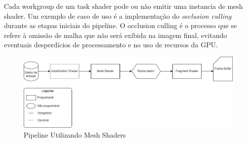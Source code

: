 Cada workgroup de um task shader pode ou não emitir uma instancia de mesh shader. Um exemplo de caso de uso é a implementação do \textit{occlusion culling} durante as etapas iniciais do pipeline. O occlusion culling é o processo que se refere à omissão de malha que não será exibida na imagem final, evitando eventuais desperdícios de processamento e no uso de recursos da GPU.

\begin{figure}
  \centering
  \includegraphics[width=1\textwidth]{imagens/PipelineRenderizacaoOpenGL-Mesh_Shader.png}
  \caption{Pipeline Utilizando Mesh Shaders}
  \label{fig:LABEL_FIG_FLUXO_TASK_MESH_SHADERS}
\end{figure}





